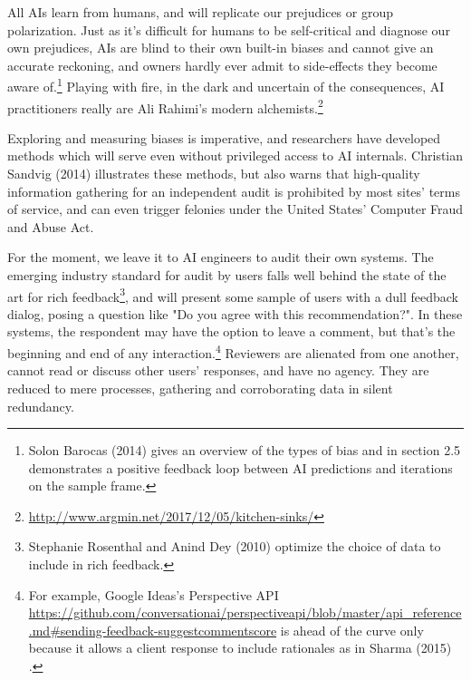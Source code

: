 \documentclass[format=sigconf]{acmart}
\begin{document}
All AIs learn from humans, and will replicate our prejudices or group polarization.  Just as it's difficult for humans to be self-critical and diagnose our own prejudices, AIs are blind to their own built-in biases and cannot give an accurate reckoning, and owners hardly ever admit to side-effects they become aware of.\footnote{Solon Barocas (2014) \citep{barocas2014data} gives an overview of the types of bias and in section 2.5 demonstrates a positive feedback loop between AI predictions and iterations on the sample frame.}  Playing with fire, in the dark and uncertain of the consequences, AI practitioners really are Ali Rahimi's modern alchemists.\footnote{\url{http://www.argmin.net/2017/12/05/kitchen-sinks/}}

Exploring and measuring biases is imperative, and researchers have developed methods which will serve even without privileged access to AI internals.  Christian Sandvig (2014) \citep{Sandvig} illustrates these methods, but also warns that high-quality information gathering for an independent audit is prohibited by most sites' terms of service, and can even trigger felonies under the United States' Computer Fraud and Abuse Act.

For the moment, we leave it to AI engineers to audit their own systems.  The emerging industry standard for audit by users falls well behind the state of the art for rich feedback\footnote{Stephanie Rosenthal and Anind Dey (2010) \citep{Rosenthal2010} optimize the choice of data to include in rich feedback.}, and will present some sample of users with a dull feedback dialog, posing a question like "Do you agree with this recommendation?".  In these systems, the respondent may have the option to leave a comment, but that's the beginning and end of any interaction.\footnote{For example, Google Ideas's Perspective API \url{https://github.com/conversationai/perspectiveapi/blob/master/api_reference.md\#sending-feedback-suggestcommentscore} is ahead of the curve only because it allows a client response to include rationales as in Sharma (2015) \citep{Sharma2015}.}  Reviewers are alienated from one another, cannot read or discuss other users' responses, and have no agency.  They are reduced to mere processes, gathering and corroborating data in silent redundancy.
\end{document}
